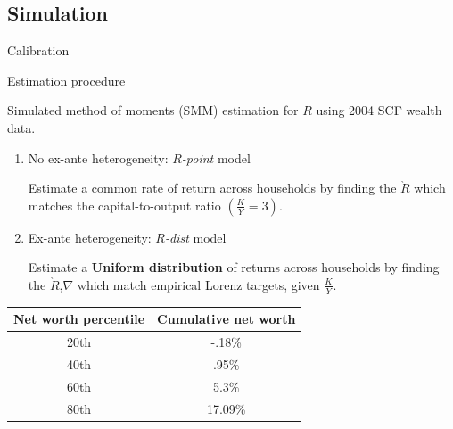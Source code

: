 \documentclass{beamer}
\begin{document}
\subsection{Simulation}

\begin{frame}{Calibration}
\vfill
\begin{table}
  \centering
  \scriptsize  %
  
\end{table}
\vfill
\end{frame}





\begin{frame}{Estimation procedure}


Simulated method of moments (SMM) estimation for $R$ using 2004 SCF wealth data.

  \begin{enumerate}
  \item No ex-ante heterogeneity: $R$\textit{-point} model
  \par Estimate a common rate of return across households by finding the $\grave{R}$ which matches the capital-to-output ratio $(\frac{K}{Y} = 3)$.
  \vspace{2.5mm}

  \item Ex-ante heterogeneity: $R$\textit{-dist} model
  \par Estimate  a \textbf{Uniform distribution} of returns across households by finding the $\grave{R}$,$\nabla$ which match empirical Lorenz targets, given $\frac{K}{Y}$.
  \end{enumerate}
  
  \centering
  \small
  \begin{tabular}{|c|c|}
\hline
Net worth percentile & Cumulative net worth \\
\hline
20th & -.18\%  \\
40th &  .95\% \\
60th &  5.3\% \\
80th &  17.09\% \\
\hline
\end{tabular}


\end{frame}
\end{document}
